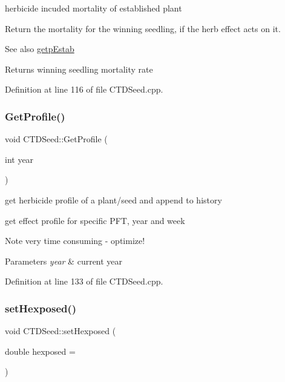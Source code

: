 herbicide incuded mortality of established plant 

Return the mortality for the winning seedling, if the herb effect acts on it. \begin{DoxySeeAlso}{See also}
\mbox{\hyperlink{class_c_t_d_seed_a0e62cd8894a79f484cdacfb026839609}{getp\+Estab}} 
\end{DoxySeeAlso}
\begin{DoxyReturn}{Returns}
winning seedling mortality rate 
\end{DoxyReturn}


Definition at line 116 of file C\+T\+D\+Seed.\+cpp.

\mbox{\label{class_c_t_d_seed_a93b488e96ce97a9b6f780ccc0c72e25c}} 
\subsubsection{\texorpdfstring{GetProfile()}{GetProfile()}}
{\footnotesize\ttfamily void C\+T\+D\+Seed\+::\+Get\+Profile (\begin{DoxyParamCaption}\item[{int}]{year }\end{DoxyParamCaption})}



get herbicide profile of a plant/seed and append to history 

get effect profile for specific P\+FT, year and week \begin{DoxyNote}{Note}
very time consuming -\/ optimize! 
\end{DoxyNote}

\begin{DoxyParams}{Parameters}
{\em year} & current year \\
\hline
\end{DoxyParams}


Definition at line 133 of file C\+T\+D\+Seed.\+cpp.

\mbox{\label{class_c_t_d_seed_a8f9ec854146a44f5921cbc8a361c0b1e}} 
\subsubsection{\texorpdfstring{setHexposed()}{setHexposed()}}
{\footnotesize\ttfamily void C\+T\+D\+Seed\+::set\+Hexposed (\begin{DoxyParamCaption}\item[{double}]{hexposed = {} }\end{DoxyParamCaption})\hspace{0.3cm}{\ttfamily [inline]}}



